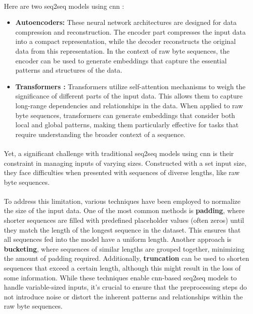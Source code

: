         \paragraph{}Here are two \acrfull{seq2seq} models using \acrshort{cnn} :
        

        \begin{itemize}
            \item \textbf{Autoencoders:} These neural network architectures\cite{hinton_reducing_2006} are designed for data compression and reconstruction. The encoder part compresses the input data into a compact representation, while the decoder reconstructs the original data from this representation. In the context of raw byte sequences, the encoder can be used to generate embeddings that capture the essential patterns and structures of the data.

            \item \textbf{Transformers :} Transformers\cite{vaswani_attention_2017} utilize self-attention mechanisms to weigh the significance of different parts of the input data. This allows them to capture long-range dependencies and relationships in the data. When applied to raw byte sequences, transformers can generate embeddings that consider both local and global patterns, making them particularly effective for tasks that require understanding the broader context of a sequence.

        \end{itemize}
        
        \paragraph{}Yet, a significant challenge with traditional \acrfull{seq2seq} models using \acrshort{cnn} is their constraint in managing inputs of varying sizes. Constructed with a set input size, they face difficulties when presented with sequences of diverse lengths, like raw byte sequences.

        \paragraph{}To address this limitation, various techniques have been employed to normalize the size of the input data. One of the most common methods is \textbf{padding}, where shorter sequences are filled with predefined placeholder values (often zeros) until they match the length of the longest sequence in the dataset. This ensures that all sequences fed into the model have a uniform length. Another approach is \textbf{bucketing}, where sequences of similar lengths are grouped together, minimizing the amount of padding required. Additionally, \textbf{truncation} can be used to shorten sequences that exceed a certain length, although this might result in the loss of some information. While these techniques enable \acrshort{cnn}-based \acrfull{seq2seq} models to handle variable-sized inputs, it's crucial to ensure that the preprocessing steps do not introduce noise or distort the inherent patterns and relationships within the raw byte sequences.
